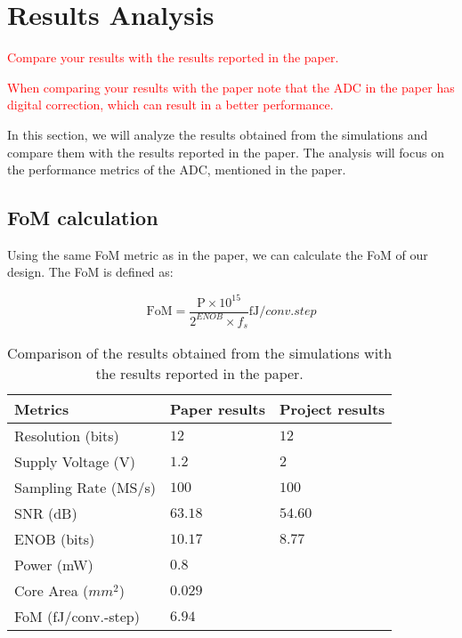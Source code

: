 \section{Results Analysis}
\label{sec:results}
\textcolor{red}{Compare your results with the results reported in the paper.}

\textcolor{red}{When comparing your results with the paper note that the ADC in the paper has digital correction, which can result in a better performance.}

In this section, we will analyze the results obtained from the simulations and compare them with the results reported in the paper. The analysis will focus on the performance metrics of the ADC, mentioned in the paper.

\subsection{FoM calculation}

Using the same FoM metric as in the paper, we can calculate the FoM of our design. The FoM is defined as:

\begin{equation}
    \text{FoM} = \frac{\text{P} \times 10^{15}}{2^{ENOB} \times f_s } \si{\femto \joule \per conv.step}
    \label{eq:FoM}
\end{equation}

\begin{table}[h]
    \centering
    \caption{Comparison of the results obtained from the simulations with the results reported in the paper.}
    \begin{tabularx}{\textwidth}{>{\centering\arraybackslash}X >{\centering\arraybackslash}X >{\centering\arraybackslash}X }
        \toprule
        \textbf{Metrics} & \textbf{Paper results} & \textbf{Project results}\\
        \midrule
        Resolution (bits) & $12$ & $12$ \\
        \midrule
        Supply Voltage (V) & $1.2$ & $2$ \\
        \midrule
        Sampling Rate (MS/s) & $100$ & $100$  \\
        \midrule
        SNR (dB) & $63.18$ & $54.60$ \\
        \midrule
        ENOB (bits) & $10.17$ & $8.77$ \\
        \midrule
        Power (mW) & $0.8$ & $ $   \\
        \midrule
        Core Area ($mm^2$) & $0.029$ & $ $   \\
        \midrule
        FoM (fJ/conv.-step) & $6.94$ & $ $  \\
        \bottomrule
    \end{tabularx}
    \label{tab:comparison_results}
\end{table}

